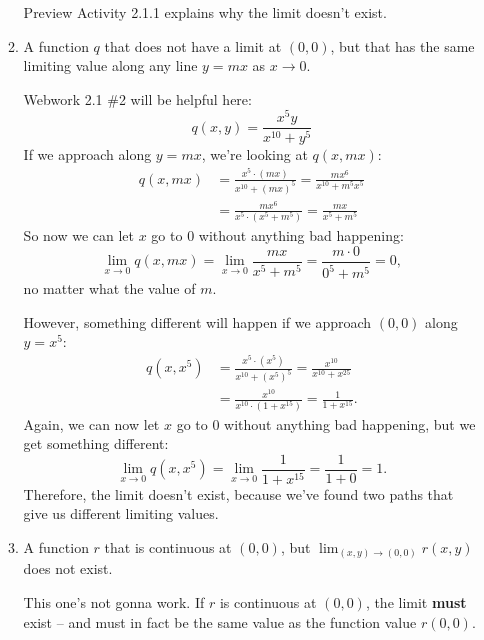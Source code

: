 \begin{enumerate}[leftmargin=0pt]
\begin{enumerate}
\begin{red}
            Preview Activity 2.1.1 explains why the limit doesn't exist.
        \end{red}
        \item A function $q$ that does not have a limit at $(0, 0)$, but that has the same limiting value along any line $y=mx$ as $x \to 0$. 
        
        \begin{red}
            Webwork 2.1 \#2 will be helpful here:
            \[q(x,y) = \frac{x^{5}y}{x^{10}+y^{5}}\]
            If we approach along $y = mx$, we're looking at $q(x, mx):$
            \begin{align*}
                q(x, mx) &= \frac{x^{5}\cdot (mx)}{x^{10}+(mx)^{5}}
                = \frac{mx^6}{x^{10} + m^5 x^5} \\
                &= \frac{mx^6}{x^5\cdot(x^5+m^5)} 
                = \frac{mx}{x^5+m^5}
            \end{align*}
            So now we can let $x$ go to 0 without anything bad happening:
            \[\lim_{x\to 0} q(x, mx) = \lim_{x \to 0} \frac{mx}{x^5+m^5} = \frac{m\cdot 0}{0^5 + m^5} = 0,\]
            no matter what the value of $m$.
            
            However, something different will happen if we approach $(0, 0)$ along $y=x^5$:
            \begin{align*}
                q(x, x^5) &= \frac{x^{5}\cdot (x^5)}{x^{10}+(x^5)^{5}}
                = \frac{x^{10}}{x^{10} + x^{25}} \\
                &= \frac{x^{10}}{x^{10}\cdot(1 + x^{15})} 
                = \frac{1}{1 + x^{15}}.
            \end{align*}
            Again, we can now let $x$ go to 0 without anything bad happening, but we get something different:
            \[\lim_{x\to 0} q(x, x^5) = \lim_{x\to 0}\frac{1}{1 + x^{15}} = \frac{1}{1+0} = 1.\]
            Therefore, the limit doesn't exist, because we've found two paths that give us different limiting values.
        \end{red}
        
        \item A function $r$ that is continuous at $(0, 0)$, but $\lim_{(x, y) \to (0, 0)} r(x, y)$ does not exist.
        
        \begin{red}
            This one's not gonna work. If $r$ is continuous at $(0, 0)$, the limit \textbf{must} exist -- and must in fact be the same value as the function value $r(0,0)$.
        \end{red}
        

\end{enumerate}
\end{enumerate}
